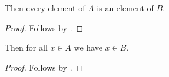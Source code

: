 

\begin{proposition}\label{phase5_quantified_subject}
    Then every element of $A$ is an element of $B$.
\end{proposition}
\begin{proof}
    Follows by \auto.
\end{proof}

\begin{proposition}\label{phase5_explicit_quantifier}
    Then for all $x\in A$ we have $x\in B$.
\end{proposition}
\begin{proof}
    Follows by \auto.
\end{proof}
